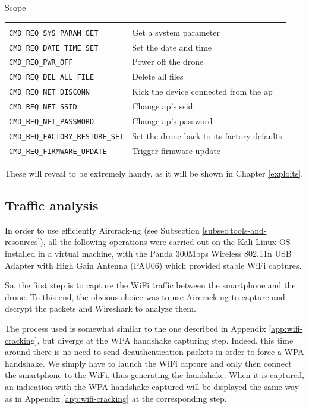 \begin{chaptercover}{Scope}
\begin{center}
  \begin{tabular}{C{7cm}L{7cm}}
   &  \\
  \texttt{CMD\_REQ\_SYS\_PARAM\_GET} & Get a system parameter \\
  \texttt{CMD\_REQ\_DATE\_TIME\_SET} & Set the date and time \\
  \texttt{CMD\_REQ\_PWR\_OFF} & Power off the drone \\
  \texttt{CMD\_REQ\_DEL\_ALL\_FILE} & Delete all files \\
  \texttt{CMD\_REQ\_NET\_DISCONN} & Kick the device connected from the \acrshort{ap} \\
  \texttt{CMD\_REQ\_NET\_SSID} & Change \acrshort{ap}'s \acrshort{ssid} \\
  \texttt{CMD\_REQ\_NET\_PASSWORD} & Change \acrshort{ap}'s password \\
  \texttt{CMD\_REQ\_FACTORY\_RESTORE\_SET} & Set the drone back to its factory defaults \\
  \texttt{CMD\_REQ\_FIRMWARE\_UPDATE} & Trigger firmware update \\
  \end{tabular}
\end{center}

These will reveal to be extremely handy, as it will be shown in Chapter \ref{exploits}.

\subsection{Traffic analysis}\label{subsec:traffic-analysis}

\begin{warning}
In order to use efficiently Aircrack-ng (see Subsection \ref{subsec:tools-and-resources}), all the following operations were carried out on the Kali Linux OS installed in a virtual machine, with the Panda 300Mbps Wireless 802.11n USB Adapter with High Gain Antenna (PAU06) \cite{panda-adapter} which provided stable WiFi captures.
\end{warning}

So, the first step is to capture the WiFi traffic between the smartphone and the drone. To this end, the obvious choice was to use Aircrack-ng to capture and decrypt the packets and Wireshark to analyze them.

The process used is somewhat similar to the one described in Appendix \ref{app:wifi-cracking}, but diverge at the WPA handshake capturing step. Indeed, this time around there is no need to send deauthentication packets in order to force a WPA handshake. We simply have to launch the WiFi capture and only then connect the smartphone to the WiFi, thus generating the handshake. When it is captured, an indication with the WPA handshake captured will be displayed the same way as in Appendix \ref{app:wifi-cracking} at the corresponding step.


\end{chaptercover}
